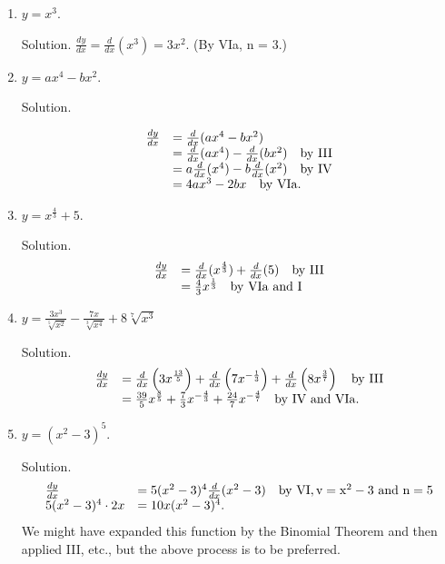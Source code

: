 \begin{enumerate}
\item
$y = x^3$.

Solution. $\frac{dy}{dx} = \frac{d}{dx}(x^3) = 3x^2$. 
(By VIa, n = 3.)

\item
$y = ax^4 - bx^2$.

Solution. 

\[
\begin{array}{ll}
\frac{dy}{dx} &	= \frac{d}{dx} (ax^4 - bx^2) \\
& = \frac{d}{dx} (ax^4) - \frac{d}{dx}( bx^2) \ \ \ {\rm	by\ III}\\
& = a\frac{d}{dx} (x^4) - b\frac{d}{dx} (x^2)  \ \ \ {\rm by\ IV}\\
 & = 4ax^3 - 2bx  \ \ \ {\rm by\ VIa}. 
\end{array}
\]

\item
$y = x^{\frac{4}{3}} + 5$.

Solution. 
\[
\begin{array}{ll}
\frac{dy}{dx} &	= \frac{d}{dx}(x^{\frac{4}{3}}) + \frac{d}{dx}(5) \ \ \ {\rm by\ III}\\
  &	= \frac{4}{3} x^{\frac{1}{3}}  \ \ \ {\rm by\  VIa\ and\ I}
\end{array}
\]


\item
$y = \frac{3x^3}{\sqrt[5]{x^2}} - \frac{7x}{\sqrt[3]{x^4}} + 8\sqrt[7]{x^3}$

Solution. 
\[
\begin{array}{ll}
\frac{dy}{dx} &	= \frac{d}{dx} \left ( 3 x^{\frac{13}{5}} \right ) 
+ \frac{d}{dx} \left ( 7 x^{-\frac{1}{3}} \right ) 
+ \frac{d}{dx} \left ( 8 x^{\frac{3}{7}} \right )   \ \ \ {\rm	by\ III}\\
&  	= \frac{39}{5} x^{\frac{8}{5}} + \frac{7}{3} x^{-\frac{4}{3}} + \frac{24}{7} x^{-\frac{4}{7}}
  \ \ \ {\rm	by\  IV\ and\ VIa}.
\end{array}
\]

\item
$y = (x^2 - 3)^5$.

Solution. 
\[
\begin{array}{ll}
\frac{dy}{dx} &=5 (x^2 - 3)^4 \frac{d}{dx} (x^2 - 3)   \ \ \ {\rm	by\ VI,
v = x^2 - 3 \ {\rm  and\ } n = 5}\\
  	5(x^2 - 3)^4 \cdot 2x & = 10x(x^2 - 3)^4. 
\end{array}
\]
We might have expanded this function by the Binomial Theorem 
and then applied III, etc., but the above process is to be preferred.


\end{enumerate}
